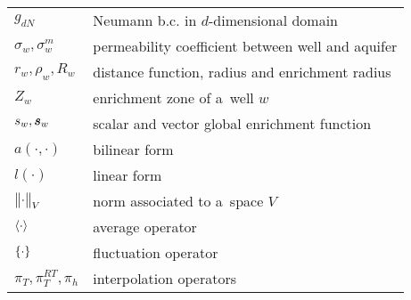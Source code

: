 \begin{tabularx}{0.9\linewidth}{@{}lX@{}}
$g_{dN}$ & Neumann b.c. in $d$-dimensional domain \\
$\sigma_w, \sigma^m_w$ & permeability coefficient between well and aquifer \\
$r_w, \rho_w, R_w$ & distance function, radius and enrichment radius \\
$Z_w$ & enrichment zone of a~well $w$ \\
$s_w, \mathbf{\boldsymbol{s}}_w$ & scalar and vector global enrichment function\\
$a(\cdot, \cdot)$ & bilinear form \\
$l(\cdot)$ & linear form \\
$\bigl\Vert\cdot\bigr\Vert_V$ & norm associated to a~space $V$\\
$\langle\cdot\rangle$ & average operator \\
$\{\cdot\}$ & fluctuation operator \\
$\pi_T, \pi^{RT}_T, \pi_h$ & interpolation operators \\
\end{tabularx}
